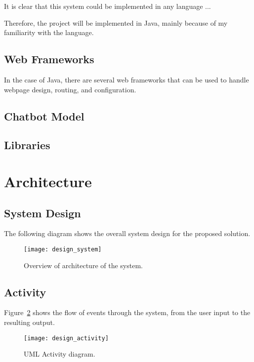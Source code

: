 It is clear that this system could be implemented in any language ...

Therefore, the project will be implemented in Java, mainly because of my familiarity with the language.


\subsection{Web Frameworks}
In the case of Java, there are several web frameworks that can be used to handle webpage design, routing, and configuration.

\subsection{Chatbot Model}


\subsection{Libraries}

\newpage
\section{Architecture}
\subsection{System Design}
The following diagram shows the overall system design for the proposed solution.

\begin{figure}[h]
	\begin{center}
		\texttt{[image: design\_system]}
	\end{center}
	\caption{Overview of architecture of the system.}
	\label{fig:design_system}
\end{figure}

\newpage
\subsection{Activity}
Figure~\ref{fig:design_activity} shows the flow of events through the system, from the user input to the resulting output. 

\begin{figure}[h]
	\begin{center}
		\texttt{[image: design\_activity]}
	\end{center}
	\caption{UML Activity diagram.}
	\label{fig:design_activity}
\end{figure}

